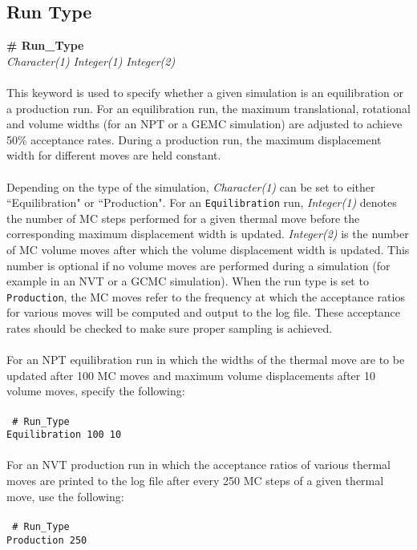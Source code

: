 \subsection{Run Type}\label{sec:Run_Type}
{\bf \# Run\_Type} \\
{\it Character(1)} {\it Integer(1)} {\it Integer(2)} \\ \\
%
This keyword is used to specify whether a given simulation is an equilibration or a production run.
For an equilibration run, the maximum translational, rotational and volume widths (for an NPT or a GEMC
simulation) are adjusted to achieve 50\% acceptance rates. During a production run, the maximum
displacement width for different moves are held constant. \\ \\
%
Depending on the type of the simulation,
{\it Character(1)} can be set to either ``Equilibration" or ``Production".  For an \texttt{Equilibration} run, {\it Integer(1)} denotes
the number of MC steps performed for a given thermal move before the corresponding maximum
displacement width is updated. {\it Integer(2)} is the number of MC volume moves after which the volume
displacement width is updated. This number is optional if no volume moves are performed during a simulation (for example in an NVT or
a GCMC simulation). When the run type is set to \texttt{Production}, the MC moves refer to the frequency at which the acceptance
ratios for various moves will be computed and output to the log file. These acceptance rates should be checked to make sure proper sampling is achieved. \\ \\
%
For an NPT equilibration run in which the widths of the thermal move are to be updated after 100 MC moves and
maximum volume displacements after 10 volume moves, specify the following: \\ \\
%
\texttt{
\# Run\_Type \\
Equilibration 100 10 \\ \\}
%
% 
For an NVT production run in which the acceptance ratios of various thermal moves are printed to the log file after
every 250 MC steps of a given thermal move, use the following: \\ \\
%
\texttt{
\# Run\_Type \\
Production 250}
%
%
%
